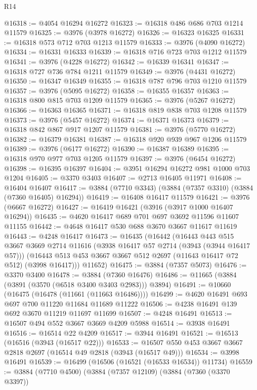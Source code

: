 \begin{lexlean}{R14}
\begin{coremodule}
@16318 := @4054 @16294 @16272
@16323 := @16318 @486 @686 @703 @1214 @11579
@16325 := @3976 (@3978 @16272)
@16326 := @16323 @16325
@16331 := @16318 @573 @712 @703 @1213 @11579
@16333 := @3976 (@4090 @16272)
@16334 := @16331 @16333
@16339 := @16318 @716 @723 @703 @1212 @11579
@16341 := @3976 (@4228 @16272)
@16342 := @16339 @16341
@16347 := @16318 @727 @736 @784 @1211 @11579
@16349 := @3976 (@4431 @16272)
@16350 := @16347 @16349
@16355 := @16318 @787 @796 @703 @1210 @11579
@16357 := @3976 (@5095 @16272)
@16358 := @16355 @16357
@16363 := @16318 @800 @815 @703 @1209 @11579
@16365 := @3976 (@5267 @16272)
@16366 := @16363 @16365
@16371 := @16318 @819 @838 @703 @1208 @11579
@16373 := @3976 (@5457 @16272)
@16374 := @16371 @16373
@16379 := @16318 @842 @867 @917 @1207 @11579
@16381 := @3976 (@5770 @16272)
@16382 := @16379 @16381
@16387 := @16318 @920 @939 @967 @1206 @11579
@16389 := @3976 (@6177 @16272)
@16390 := @16387 @16389
@16395 := @16318 @970 @977 @703 @1205 @11579
@16397 := @3976 (@6454 @16272)
@16398 := @16395 @16397
@16404 := @3951 @16294 @16272 @981 @1000 @703 @1204
@16405 := @3370 @3403
@16407 := @2713 @16405 @11971
@16408 := @16404 @16407
@16417 := @3884 (@7710 @3343) (@3884 (@7357 @3310) (@3884 (@7360 @16405) @16294))
@16419 := @16408 @16417 @11579
@16421 := @3976 (@6667 @16272)
@16427 := @16419 @16421 (@3916 (@3917 @1000 @16407 @16294))
@16435 := @4620 @16417 @689 @701 @697 @3692 @11596 @11607 @11155
@16442 := @4648 @16417 @530 @688 @3670 @3667 @11617 @11619
@16443 := @4248 @16417
@16473 := @16435
    (@16442
      (@16443
        @443
        @515
        @3667
        @3669
        @2714
        @11616
        (@3938 @16417 @57 @2714 (@3943 (@3944 @16417 @57)))
        (@16443 @513 @453 @3667 @3667 @512 @2697 (@11643 @16417 @72 @512) (@3998 @16417)))
      @11652)
@16475 := @3884 (@7357 @5073)
@16476 := @3370 @3400
@16478 := @3884 (@7360 @16476)
@16486 := @11665 (@3884 (@3891 (@3570 (@6518 @3400 @3403 @2983))) @3894)
@16491 := @10660 (@16475 (@16478 (@11661 (@11663 @16486))))
@16499 := @4620 @16491 @693 @697 @700 @11220 @11684 @11689 @11222
@16506 := @4238 @16491 @139 @692 @3670 @11219 @11697 @11699
@16507 := @4248 @16491
@16513 := @16507 @494 @552 @3667 @3669 @4209 @5988
@16514 := @3938 @16491
@16516 := @16514 @22 @4209
@16517 := @3944 @16491
@16521 := @16513 (@16516 (@3943 (@16517 @22)))
@16533 := @16507 @550 @453 @3667 @3667 @2818 @2697 (@16514 @49 @2818 (@3943 (@16517 @49)))
@16534 := @3998 @16491
@16539 := @16499 (@16506 (@16521 (@16533 @16534)) @11734)
@16559 := @3884
    (@7710 @4500)
    (@3884
      (@7357 @12109)
      (@3884
        (@7360 (@3370 @3397))

\end{coremodule}
\end{lexlean}
